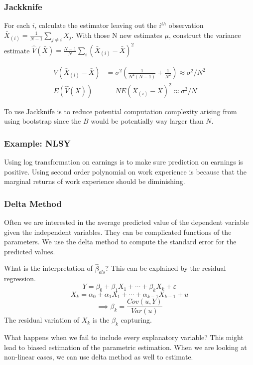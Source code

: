 \documentclass[11pt, a4paper, oneside]{article}
\theoremstyle{definition}
\theoremstyle{proposition}
\theoremstyle{corollary}
\theoremstyle{lemma}
\theoremstyle{theorem}
\begin{document}
\subsubsection{Jackknife}
For each $i$, calculate the estimator leaving out the $i^{th}$ observation $\bar{X}_{(i)} = \frac{1}{N-1}\sum_{j\neq i} X_j$. With those N new estimates $\mu$, construct the variance estimate $\hat{V}(\bar{X}) = \frac{N-1}{N}\sum_i(\bar{X}_{(i)} - \bar{X})^2$

\begin{align*}
V(\bar{X}_{(i)} - \bar{X}) &= \sigma^2(\frac{1}{N^2(N-1)} + \frac{1}{N^2}) \approx \sigma^2/N^2 \\
E(\hat{V}(\bar{X})) &= NE(\bar{X}_{(i)} - \bar{X})^2 \approx \sigma^2/N
\end{align*}

To use Jackknife is to reduce potential computation complexity arising from using bootstrap since the $B$ would be potentially way larger than $N$. 

\subsubsection*{Example: NLSY}
Using log transformation on earnings is to make sure prediction on earnings is positive. Using second order polynomial on work experience is because that the marginal returns of work experience should be diminishing.

\subsubsection{Delta Method}
Often we are interested in the average predicted value of the dependent variable given the independent variables. They can be complicated functions of the parameters. We use the delta method to compute the standard error for the predicted values. 

What is the interpretation of $\hat{\beta}_{ols}$? This can be explained by the residual regression. 
$$Y = \beta_0 + \beta_1X_1+ \cdots + \beta_k X_k + \varepsilon$$
$$X_k = \alpha_0 +\alpha_1X_1 + \cdots + \alpha_{k-1}X_{k-1} + u$$
$$\implies \beta_k = \frac{Cov(u, Y)}{Var(u)}$$
The residual variation of $X_k$ is the $\beta_k$ capturing. 

What happens when we fail to include every explanatory variable? This might lead to biased estimation of the parametric estimation. When we are looking at non-linear cases, we can use delta method as well to estimate.
\end{document}

